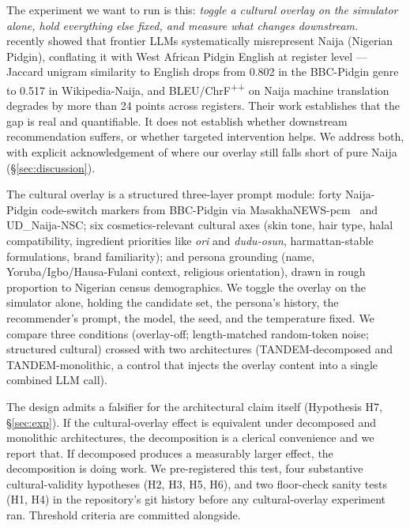 \documentclass[8pt,twocolumn,a4paper]{extarticle}
\begin{document}
The experiment we want to run is this: \emph{toggle a cultural overlay on the simulator alone, hold everything else fixed, and measure what changes downstream.}~\citet{adelani2024naija} recently showed that frontier LLMs systematically misrepresent Naija (Nigerian Pidgin), conflating it with West African Pidgin English at register level --- Jaccard unigram similarity to English drops from 0.802 in the BBC-Pidgin genre to 0.517 in Wikipedia-Naija, and BLEU/ChrF\textsuperscript{++} on Naija machine translation degrades by more than 24 points across registers. Their work establishes that the gap is real and quantifiable. It does not establish whether downstream recommendation suffers, or whether targeted intervention helps. We address both, with explicit acknowledgement of where our overlay still falls short of pure Naija (\S\ref{sec:discussion}).

The cultural overlay is a structured three-layer prompt module: forty Naija-Pidgin code-switch markers from BBC-Pidgin via MasakhaNEWS-pcm~\citep{adelani2023masakhanews} and UD\_Naija-NSC; six cosmetics-relevant cultural axes (skin tone, hair type, halal compatibility, ingredient priorities like \textit{ori} and \textit{dudu-osun}, harmattan-stable formulations, brand familiarity); and persona grounding (name, Yoruba/Igbo/Hausa-Fulani context, religious orientation), drawn in rough proportion to Nigerian census demographics. We toggle the overlay on the simulator alone, holding the candidate set, the persona's history, the recommender's prompt, the model, the seed, and the temperature fixed. We compare three conditions (overlay-off; length-matched random-token noise; structured cultural) crossed with two architectures (TANDEM-decomposed and TANDEM-monolithic, a control that injects the overlay content into a single combined LLM call).

The design admits a falsifier for the architectural claim itself (Hypothesis H7, \S\ref{sec:exp}). If the cultural-overlay effect is equivalent under decomposed and monolithic architectures, the decomposition is a clerical convenience and we report that. If decomposed produces a measurably larger effect, the decomposition is doing work. We pre-registered this test, four substantive cultural-validity hypotheses (H2, H3, H5, H6), and two floor-check sanity tests (H1, H4) in the repository's git history before any cultural-overlay experiment ran. Threshold criteria are committed alongside.
\end{document}
